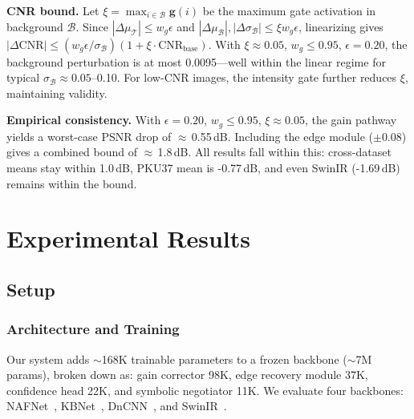 \documentclass[journal,twoside,web]{ieeecolor}
\begin{document}
\textbf{CNR bound.} Let $\xi = \max_{i \in \mathcal{B}} \mathbf{g}(i)$ be the maximum gate activation in background $\mathcal{B}$. Since $|\Delta\mu_\mathcal{T}| \leq w_g \epsilon$ and $|\Delta\mu_\mathcal{B}|, |\Delta\sigma_\mathcal{B}| \leq \xi w_g \epsilon$, linearizing gives $|\Delta\mathrm{CNR}| \leq (w_g \epsilon / \sigma_{\mathcal{B}}) (1 + \xi \cdot \mathrm{CNR}_{\mathrm{base}})$. With $\xi \approx 0.05$, $w_g \leq 0.95$, $\epsilon = 0.20$, the background perturbation is at most 0.0095---well within the linear regime for typical $\sigma_\mathcal{B} \approx 0.05$--0.10. For low-CNR images, the intensity gate further reduces $\xi$, maintaining validity.

\textbf{Empirical consistency.} With $\epsilon = 0.20$, $w_g \leq 0.95$, $\xi \approx 0.05$, the gain pathway yields a worst-case PSNR drop of ${\approx}$\,0.55\,dB. Including the edge module ($\pm 0.08$) gives a combined bound of ${\approx}$\,1.8\,dB. All results fall within this: cross-dataset means stay within 1.0\,dB, PKU37 mean is -0.77\,dB, and even SwinIR (-1.69\,dB) remains within the bound.

\section{Experimental Results}
\label{sec:experiments}

\subsection{Setup}
\label{sec:setup}

\subsubsection{Architecture and Training}
Our system adds ${\sim}$168K trainable parameters to a frozen backbone (${\sim}$7M params), broken down as: gain corrector 98K, edge recovery module 37K, confidence head 22K, and symbolic negotiator 11K. We evaluate four backbones: NAFNet~\cite{chen2022simple}, KBNet~\cite{zhang2023kbnet}, DnCNN~\cite{zhang2017beyond}, and SwinIR~\cite{liang2021swinir}.
\end{document}
